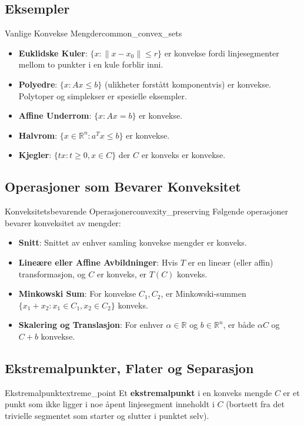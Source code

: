 \subsection{Eksempler}
\begin{example}{Vanlige Konvekse Mengder}{common_convex_sets}
    \begin{itemize}
        \item \textbf{Euklidske Kuler}: $\bigl\{ x : \|x - x_0\|\le r \bigr\}$ er konvekse fordi linjesegmenter mellom to punkter i en kule forblir inni.
        \item \textbf{Polyedre}: $\{x : A x \le b\}$ (ulikheter forstått komponentvis) er konvekse. Polytoper og simplekser er spesielle eksempler.
        \item \textbf{Affine Underrom}: $\{x : A x = b\}$ er konvekse.
        \item \textbf{Halvrom}: $\{x \in \mathbb{R}^n : a^T x \leq b\}$ er konvekse.
        \item \textbf{Kjegler}: $\{tx : t \geq 0, x \in C\}$ der $C$ er konveks er konvekse.
    \end{itemize}
\end{example}

\subsection{Operasjoner som Bevarer Konveksitet}
\begin{theorem}{Konveksitetsbevarende Operasjoner}{convexity_preserving}
    Følgende operasjoner bevarer konveksitet av mengder:
    \begin{itemize}
        \item \textbf{Snitt}: Snittet av enhver samling konvekse mengder er konveks.
        \item \textbf{Lineære eller Affine Avbildninger}: Hvis $T$ er en lineær (eller affin) transformasjon, og $C$ er konveks, er $T(C)$ konveks.
        \item \textbf{Minkowski Sum}: For konvekse $C_1,C_2$, er Minkowski-summen $\{x_1 + x_2 : x_1\in C_1, x_2\in C_2\}$ konveks.
        \item \textbf{Skalering og Translasjon}: For enhver $\alpha \in \mathbb{R}$ og $b \in \mathbb{R}^n$, er både $\alpha C$ og $C + b$ konvekse.
    \end{itemize}
\end{theorem}

\subsection{Ekstremalpunkter, Flater og Separasjon}
\begin{definition}{Ekstremalpunkt}{extreme_point}
    Et \textbf{ekstremalpunkt} i en konveks mengde $C$ er et punkt som ikke ligger i noe åpent linjesegment inneholdt i $C$ (bortsett fra det trivielle segmentet som starter og slutter i punktet selv).
\end{definition}

